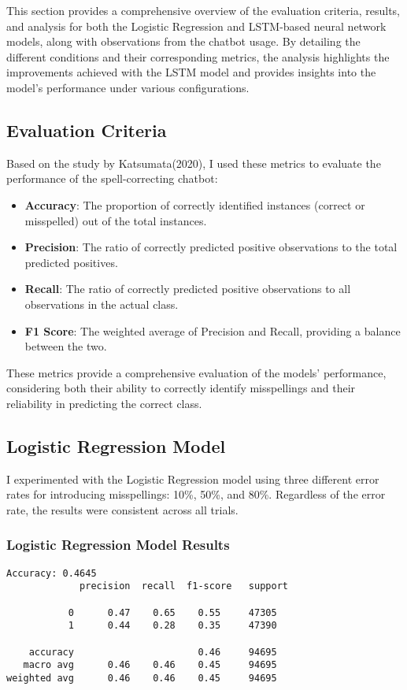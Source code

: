 This section provides a comprehensive overview of the evaluation criteria, results, and analysis for both the Logistic Regression and LSTM-based neural network models, along with observations from the chatbot usage. By detailing the different conditions and their corresponding metrics, the analysis highlights the improvements achieved with the LSTM model and provides insights into the model's performance under various configurations.

\subsection{Evaluation Criteria}
Based on the study by Katsumata(2020)\cite{Katsumata}, I used these metrics to evaluate the performance of the spell-correcting chatbot:
\begin{itemize}
    \item \textbf{Accuracy}: The proportion of correctly identified instances (correct or misspelled) out of the total instances.
    \item \textbf{Precision}: The ratio of correctly predicted positive observations to the total predicted positives.
    \item \textbf{Recall}: The ratio of correctly predicted positive observations to all observations in the actual class.
    \item \textbf{F1 Score}: The weighted average of Precision and Recall, providing a balance between the two.
\end{itemize}

These metrics provide a comprehensive evaluation of the models' performance, considering both their ability to correctly identify misspellings and their reliability in predicting the correct class.

\subsection{Logistic Regression Model}

I experimented with the Logistic Regression model using three different error rates for introducing misspellings: 10\%, 50\%, and 80\%. Regardless of the error rate, the results were consistent across all trials.

\subsubsection{Logistic Regression Model Results}

\begin{verbatim}
Accuracy: 0.4645
             precision  recall  f1-score   support

           0      0.47    0.65    0.55     47305
           1      0.44    0.28    0.35     47390

    accuracy                      0.46     94695
   macro avg      0.46    0.46    0.45     94695
weighted avg      0.46    0.46    0.45     94695
\end{verbatim}

